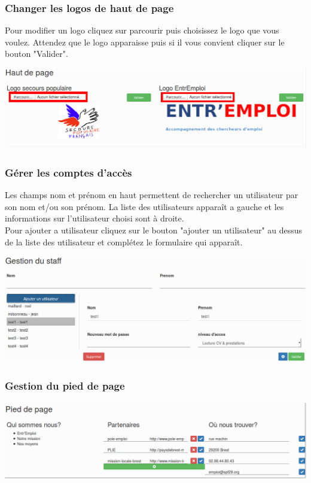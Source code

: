 \documentclass[a4paper, 12pt]{report}
\begin{document}
\subsubsection{Changer les logos de haut de page}
Pour modifier un logo cliquez sur parcourir puis choisissez le logo que vous voulez. Attendez que le logo apparaisse puis si il vous convient cliquer sur le bouton "Valider".
\begin{center}
\includegraphics[width=16cm]{adminLogos.png}
\end{center}
\subsubsection{Gérer les comptes d’accès}
Les champs nom et prénom en haut permettent de rechercher un utilisateur par son nom et/ou son prénom.
La liste des utilisateurs apparaît a gauche et les informations sur l'utilisateur choisi sont à droite.\\
Pour ajouter a utilisateur cliquez sur le bouton "ajouter un utilisateur" au dessus de la liste des utilisateur et complétez le formulaire qui apparaît.
\begin{center}
\includegraphics[width=16cm]{adminStaff.png}
\end{center}
\subsubsection{Gestion du pied de page}
\begin{center}
\includegraphics[width=16cm]{adminFooter.png}
\end{center}
\end{document}
